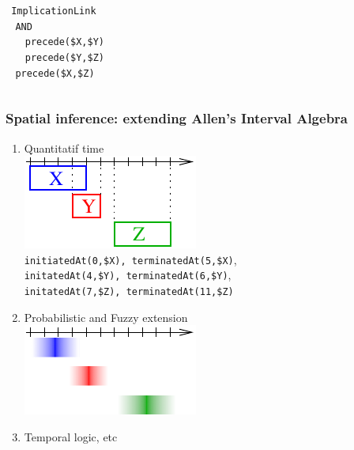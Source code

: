 \documentclass{beamer}
\begin{document}
{\begin{enumerate}
{\begin{columns}
        \column{2in}
        
        {\tiny
          {\tt 
            ImplicationLink\\
            $\ \ \ \ $AND\\
            $\ \ \ \ \ \ \ \ $precede(\$X,\$Y)\\
            $\ \ \ \ \ \ \ \ $precede(\$Y,\$Z)\\
            $\ \ \ \ $precede(\$X,\$Z)\\
          }
        }
        
      \end{columns}
    }
    
  \end{enumerate}

}

\frame
{
  \frametitle{Spatial inference: extending Allen's Interval Algebra}

  \begin{enumerate}
  \item<+-> Quantitatif time\\
    \includegraphics[scale=0.8]{quant_time.pdf}\\
    {\tiny
    {\tt initiatedAt(0,{\color{blue}\$X}),
      terminatedAt(5,{\color{blue}\$X})},\\
    {\tt initatedAt(4,{\color{red}\$Y}),
      terminatedAt(6,{\color{red}\$Y})},\\
    {\tt initatedAt(7,{\color{green}\$Z}),
      terminatedAt(11,{\color{green}\$Z})}\\
    }
  \item<+-> Probabilistic and Fuzzy extension\\
  \includegraphics[scale=0.8]{fuzzy_quant_time.pdf}
  \item<+-> Temporal logic, etc
  \end{enumerate}
}
\end{document}
